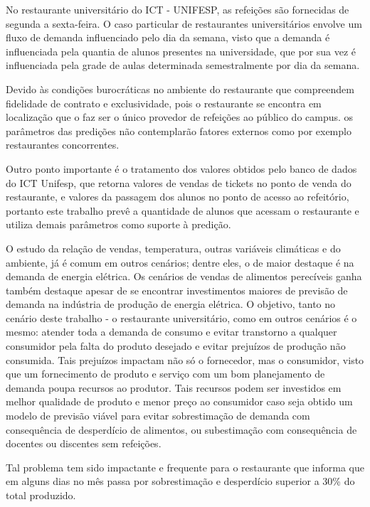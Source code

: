 \documentclass[	12pt, Times, openright, twoside, a4paper, english, brazil]{abntex2}
\begin{document}
        No restaurante universitário do ICT - UNIFESP, as refeições são fornecidas de segunda a sexta-feira. O caso particular de restaurantes universitários envolve um fluxo de demanda influenciado pelo dia da semana, visto que a demanda é influenciada pela quantia de alunos presentes na universidade, que por sua vez é influenciada pela grade de aulas determinada semestralmente por dia da semana. 
        
        Devido às condições burocráticas no ambiente do restaurante que compreendem fidelidade de contrato e exclusividade, pois o restaurante se encontra em localização que o faz ser o único provedor de refeições ao público do campus. os parâmetros das predições não contemplarão fatores externos como por exemplo restaurantes concorrentes.

        Outro ponto importante é o tratamento dos valores obtidos pelo banco de dados do ICT Unifesp, que retorna valores de vendas de tickets no ponto de venda do restaurante, e valores da passagem dos alunos no ponto de acesso ao refeitório, portanto  este trabalho prevê a quantidade de alunos que acessam o restaurante  e  utiliza demais parâmetros  como suporte à predição.

        O estudo da relação de vendas, temperatura, outras variáveis climáticas e do ambiente, já é comum em outros cenários; dentre eles, o de maior destaque é na demanda de energia elétrica. Os cenários de vendas de alimentos perecíveis ganha também destaque apesar de se encontrar investimentos maiores de previsão de demanda na indústria de produção de energia elétrica. O objetivo, tanto no cenário deste trabalho - o restaurante universitário, como em outros cenários é o mesmo: atender toda a demanda de consumo e evitar transtorno a qualquer consumidor pela falta do produto desejado e evitar prejuízos de produção não consumida. Tais prejuízos impactam não só o fornecedor, mas o consumidor, visto que um fornecimento de produto e serviço com um bom planejamento de demanda poupa recursos ao produtor. Tais recursos podem ser investidos em melhor qualidade de produto e menor preço ao consumidor caso seja obtido um modelo de previsão viável para evitar sobrestimação de demanda com consequência de desperdício de alimentos, ou subestimação com consequência de docentes ou discentes sem refeições. 

        Tal problema tem sido impactante e frequente para o restaurante que informa que em alguns dias no mês passa por sobrestimação e desperdício superior a 30\% do total produzido.
\end{document}
